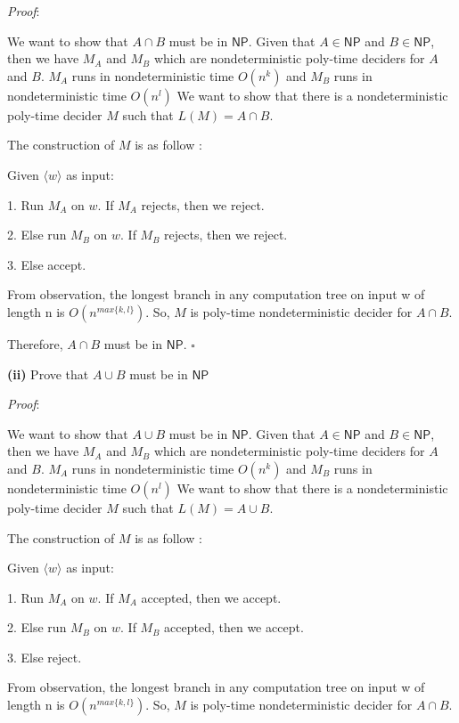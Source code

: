 \documentclass[a4paper, 11pt]{article}
\renewcommand{\part}[1] {\vspace{.10in} {\bf (#1)}}
\begin{document}
	{\em Proof}: 
	
	We want to show that $A \cap B$ must be in $\textsf{NP}$. Given that $A \in \textsf{NP} $ and $B \in \textsf{NP}$, then we have $M_A$ and $M_B$ which are nondeterministic poly-time deciders for $A$ and $B$. $M_A$ runs in nondeterministic time $O(n^k)$ and $M_B$ runs in nondeterministic time $O(n^l)$ We want to show that there is a nondeterministic poly-time decider $M$ such that $L(M) = A \cap B$. 
	
	The construction of $M$ is as follow :
	
	Given $\langle w \rangle$ as input:
	
	1. Run $M_A$ on $w$. If $M_A$ rejects, then we reject.
	
	2. Else run $M_B$ on $w$. If $M_B$ rejects, then we reject.
	
	3. Else accept.
	
	From observation, the longest branch in any computation tree on input w of length n is $O(n^{max\{k,l\}})$. So, $M$ is poly-time nondeterministic decider for $A \cap B$.
	
	Therefore, $A \cap B$ must be in $\textsf{NP}$.
	 $\square$
	
	\part{ii} Prove that $A \cup B$ must be in $\textsf{NP}$
	
	{\em Proof}: 
	
	We want to show that $A \cup B$ must be in $\textsf{NP}$. Given that $A \in \textsf{NP} $ and $B \in \textsf{NP}$, then we have $M_A$ and $M_B$ which are nondeterministic poly-time deciders for $A$ and $B$. $M_A$ runs in nondeterministic time $O(n^k)$ and $M_B$ runs in nondeterministic time $O(n^l)$ We want to show that there is a nondeterministic poly-time decider $M$ such that $L(M) = A \cup B$. 
	
	The construction of $M$ is as follow :
	
	Given $\langle w \rangle$ as input:
	
	1. Run $M_A$ on $w$. If $M_A$ accepted, then we accept.
	
	2. Else run $M_B$ on $w$. If $M_B$ accepted, then we accept.
	
	3. Else reject.
	
	From observation, the longest branch in any computation tree on input w of length n is $O(n^{max\{k,l\}})$. So, $M$ is poly-time nondeterministic decider for $A \cap B$.
	
\end{document}
